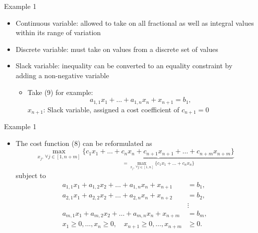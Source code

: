 \documentclass[aspectratio=169,hyperref,UTF8,CJK]{beamer}
\begin{document}
\begin{frame}{Example 1}
  \small
  \begin{itemize}
    \item Continuous variable: allowed to take on all fractional as well as integral values within its range of variation
    \item Discrete variable: must take on values from a discrete set of values
    \item Slack variable: inequality can be converted to an equality constraint by adding a non-negative variable
      \begin{itemize}
        \item Take (9) for example:
          \begin{equation*}
            a_{1,1}x_1+\ldots+a_{1,n}x_n+x_{n+1}=b_1,
          \end{equation*}
          $x_{n+1}$: Slack variable, assigned a cost coefficient of $c_{n+1}=0$
      \end{itemize}
  \end{itemize}
\end{frame}

\begin{frame}{Example 1}
  \footnotesize
  \begin{itemize}
    \item The cost function (8) can be reformulated as
      \begin{equation*}
        \max_{x_j,\,\forall j\in[1,n+m]}
        \underbrace{\{c_1x_1+\ldots+c_nx_n+c_{n+1}x_{n+1}+\ldots+c_{n+m}x_{n+m}\}}
        _{=\max_{x_j,\,\forall j\in[1,n]}\{c_1x_1+\ldots+c_nx_n\}}
      \end{equation*}
      subject to
      \begin{align*}
        a_{1,1}x_1+a_{1,2}x_2+\ldots+a_{1,n}x_n+x_{n+1}&=b_1,\\
        a_{2,1}x_1+a_{2,2}x_2+\ldots+a_{2,n}x_n+x_{n+2}&=b_2,\\
        &\vdots\\
        a_{m,1}x_1+a_{m,2}x_2+\ldots+a_{m,n}x_n+x_{n+m}&=b_m,\\
        x_1\ge0,\ldots,x_n\ge0,\quad x_{n+1}\ge0,\ldots,x_{n+m}&\ge0.
      \end{align*}
  \end{itemize}
\end{frame}
\end{document}
